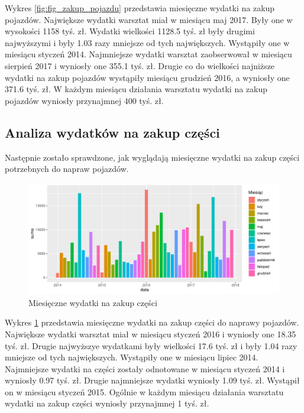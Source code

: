\documentclass{article}\usepackage[]{graphicx}\usepackage[]{xcolor}
\makeatletter
\def\maxwidth{ %
  \ifdim\Gin@nat@width>\linewidth
    \linewidth
  \else
    \Gin@nat@width
  \fi
}
\newenvironment{knitrout}{}{} %
\makeatother
\begin{document}
Wykres \ref{fig:fig_zakup_pojazdu} przedstawia miesięczne wydatki na zakup pojazdów. 
Największe wydatki warsztat miał w miesiącu maj 2017. Były one w wysokości 1158 tyś. zł. 
Wydatki wielkości 1128.5 tyś. zł były drugimi najwyższymi i były 1.03 razy mniejsze od tych największych. Wystąpiły one w miesiącu styczeń 2014.
Najmniejsze wydatki warsztat zaobserwował w miesiącu sierpień 2017 i wyniosły one 355.1 tyś. zł. 
Drugie co do wielkości najniższe wydatki na zakup pojazdów wystąpiły miesiącu grudzień 2016, a wyniosły one 371.6 tyś. zł.
W każdym miesiącu działania warsztatu wydatki na zakup pojazdów wyniosły przynajmnej 400 tyś. zł.

\subsection{Analiza wydatków na zakup części}

Następnie zostało sprawdzone, jak wyglądają miesięczne wydatki na zakup części potrzebnych do napraw pojazdów.

\begin{knitrout}
\color{fgcolor}\begin{figure}[H]

{\centering \includegraphics[width=\maxwidth]{figure/fig_zakup_czesci-1} 

}

\caption[Miesięczne wydatki na zakup części]{Miesięczne wydatki na zakup części}\label{fig:fig_zakup_czesci}
\end{figure}

\end{knitrout}

Wykres \ref{fig:fig_zakup_czesci} przedstawia miesięczne wydatki na zakup części do naprawy pojazdów.
Największe wydatki warsztat miał w miesiącu styczeń 2016 i wyniosły one 18.35 tyś. zł. 
Drugie najwyższye wydatkami były wielkości 17.6 tyś. zł i były 1.04 razy mniejsze od tych największych. Wystąpiły one w miesiącu lipiec 2014.
Najmniejsze wydatki na części zostały odnotowane w miesiącu styczeń 2014 i wyniosły 0.97 tyś. zł. 
Drugie najmniejsze wydatki wyniosły 1.09 tyś. zł. Wystąpił on w miesiącu styczeń 2015.
Ogólnie w każdym miesiącu działania warsztatu wydatki na zakup części wyniosły przynajmnej 1 tyś. zł.
\end{document}
